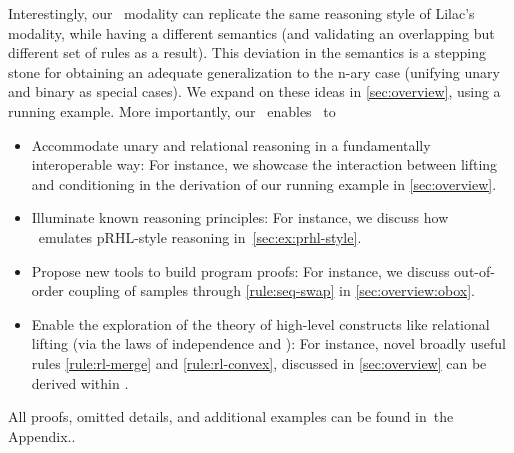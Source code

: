 Interestingly, our \supercond\ modality can replicate the same reasoning
style of Lilac's modality, while having a different semantics
(and validating an overlapping but different set of rules as a result).
This deviation in the semantics is a stepping stone for obtaining an
adequate generalization to the \pre n-ary case (unifying unary and binary as special cases).
We expand on these ideas in \cref{sec:overview}, using a running example.
More importantly, our \supercond\  enables \thelogic\ to
\begin{itemize}
\item Accommodate unary and relational reasoning
  in a fundamentally interoperable way: For instance, we showcase the interaction between lifting and conditioning in the derivation of our running example in \cref{sec:overview}.
\item Illuminate known reasoning principles: For instance, we discuss how \thelogic\ emulates pRHL-style reasoning
  in~\cref{sec:ex:prhl-style}.
\item Propose new tools to build program proofs: For instance, we discuss out-of-order coupling of samples through \ref{rule:seq-swap} in \cref{sec:overview:obox}.\item Enable the exploration of the theory of high-level constructs
   like relational lifting (via the laws of independence and \supercond): For instance, novel broadly useful rules \ref{rule:rl-merge} and \ref{rule:rl-convex}, discussed in \cref{sec:overview} can be derived within \thelogic.
\end{itemize}
All proofs, omitted details, and additional examples can be found in~\ifappendix the Appendix.\else\cite{fullversion}.\fi  \ifappendix\pagebreak\fi
